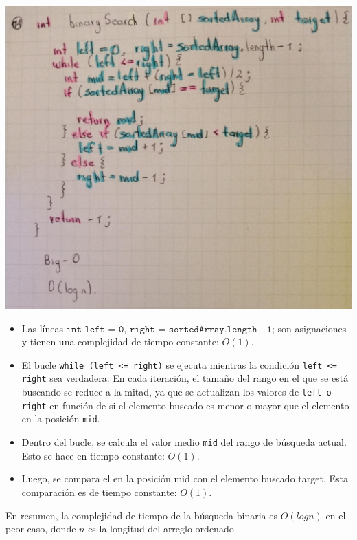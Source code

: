 \documentclass[a4paper,onecolumn,10pt]{article}
\begin{document}
\includegraphics[width=1\linewidth]{imagenes/punto 14.jpeg}

\begin{itemize}

    \item Las líneas $\texttt{int left = 0, right = sortedArray.length - 1;}$ son asignaciones y tienen una complejidad de tiempo constante: $O(1)$.

    \item El bucle \texttt{while (left <= right)} se ejecuta mientras la condición \texttt{left <= right} sea verdadera. En cada iteración, el tamaño del rango en el que se está buscando se reduce a la mitad, ya que se actualizan los valores de \texttt{left o right} en función de si el elemento buscado es menor o mayor que el elemento en la posición \texttt{mid}.

    \item Dentro del bucle, se calcula el valor medio \texttt{mid} del rango de búsqueda actual. Esto se hace en tiempo constante: $O(1)$.

    \item Luego, se compara el en la posición mid con el elemento buscado target. Esta comparación es de tiempo constante: $O(1)$.

\end{itemize}

En resumen, la complejidad de tiempo de la búsqueda binaria es $O(log n)$ en el peor caso, donde $n$ es la longitud del arreglo ordenado\\
\end{document}
